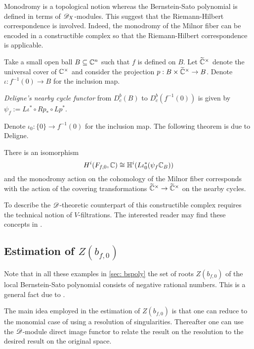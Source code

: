 Monodromy is a topological notion whereas the Bernstein-Sato polynomial is defined in terms of $\mathscr{D}_X$-modules.
This suggest that the Riemann-Hilbert correspondence is involved.
Indeed, the monodromy of the Milnor fiber can be encoded in a constructible complex so that the Riemann-Hilbert correspondence is applicable.

Take a small open ball $B\subseteq \mathbb{C}^n$ such that $f$ is defined on $B$.
Let $\widetilde{\mathbb{C}}^\times$ denote the universal cover of $\mathbb{C}^\times$ and consider the projection $p:B\times \widetilde{\mathbb{C}}^\times \to B$.
Denote $\iota:f^{-1}(0)\to B$ for the inclusion map.
\begin{definition}
  {\it Deligne's nearby cycle functor} from $D^b_c(B)$ to $D_c^b(f^{-1}(0))$ is given by $\psi_f:= L\iota^* \circ Rp_*\circ Lp^*$.
\end{definition}
Denote $\iota_0:\{0\}\to f^{-1}(0)$ for the inclusion map.
The following theorem is due to Deligne.
\begin{theorem}
  There is an isomorphism
  $$H^i(F_{f,0}, \mathbb{C}) \cong \mathbb{H}^i(L\iota_0^* (\psi_f \mathbb{C}_B)) $$
  and the monodromy action on the cohomology of the Milnor fiber corresponds with the action of the covering transformations $\widetilde{\mathbb{C}}^\times \to \widetilde{\mathbb{C}}^\times$ on the nearby cycles.
\end{theorem}
To describe the $\mathscr{D}$-theoretic counterpart of this constructible complex requires the technical notion of $V$-filtrations.
The interested reader may find these concepts in \cite{budur2015bernstein}.
\subsection{Estimation of $Z(b_{f,0})$}\label{sec: Estimation}
Note that in all these examples in \cref{sec: bspoly} the set of roots $Z(b_{f,0})$ of the local Bernstein-Sato polynomial consists of negative rational numbers.
This is a general fact due to \cite{kashiwara1976b}.

The main idea employed in the estimation of $Z(b_{f,0})$ is that one can reduce to the monomial case of  using a resolution of singularities.
Thereafter one can use the $\mathscr{D}$-module direct image functor to relate the result on the resolution to the desired result on the original space.

